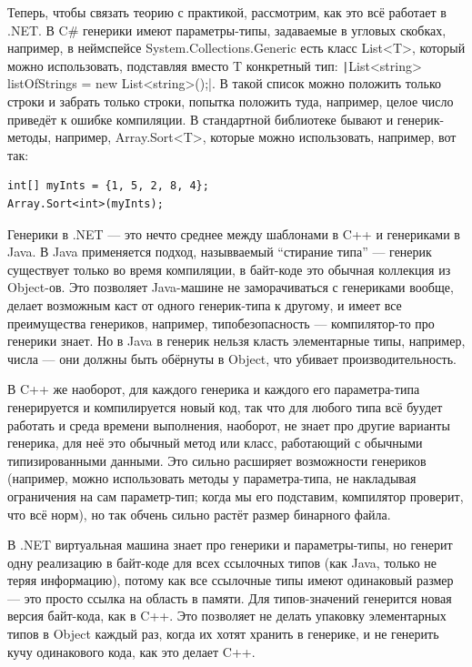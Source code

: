 \documentclass[a5paper]{article}
\begin{document}
Теперь, чтобы связать теорию с практикой, рассмотрим, как это всё работает в .NET. В C\# генерики имеют параметры-типы, задаваемые в угловых скобках, например, в неймспейсе System.Collections.Generic есть класс List<T>, который можно использовать, подставляя вместо T конкретный тип: \texttt|List<string> listOfStrings = new List<string>();|. В такой список можно положить только строки и забрать только строки, попытка положить туда, например, целое число приведёт к ошибке компиляции. В стандартной библиотеке бывают и генерик-методы, например, Array.Sort<T>, которые можно использовать, например, вот так:

\begin{verbatim}
int[] myInts = {1, 5, 2, 8, 4};
Array.Sort<int>(myInts);
\end{verbatim}

Генерики в .NET --- это нечто среднее между шаблонами в C++ и генериками в Java. В Java применяется подход, назывваемый ``стирание типа'' --- генерик существует только во время компиляции, в байт-коде это обычная коллекция из Object-ов. Это позволяет Java-машине не заморачиваться с генериками вообще, делает возможным каст от одного генерик-типа к другому, и имеет все преимущества генериков, например, типобезопасность --- компилятор-то про генерики знает. Но в Java в генерик нельзя класть элементарные типы, например, числа --- они должны быть обёрнуты в Object, что убивает производительность.

В C++ же наоборот, для каждого генерика и каждого его параметра-типа генерируется и компилируется новый код, так что для любого типа всё буудет работать и среда времени выполнения, наоборот, не знает про другие варианты генерика, для неё это обычный метод или класс, работающий с обычными типизированными данными. Это сильно расширяет возможности генериков (например, можно использовать методы у параметра-типа, не накладывая ограничения на сам параметр-тип; когда мы его подставим, компилятор проверит, что всё норм), но так обчень сильно растёт размер бинарного файла.

В .NET виртуальная машина знает про генерики и параметры-типы, но генерит одну реализацию в байт-коде для всех ссылочных типов (как Java, только не теряя информацию), потому как все ссылочные типы имеют одинаковый размер --- это просто ссылка на область в памяти. Для типов-значений генерится новая версия байт-кода, как в C++. Это позволяет не делать упаковку элементарных типов в Object каждый раз, когда их хотят хранить в генерике, и не генерить кучу одинакового кода, как это делает C++.
\end{document}
